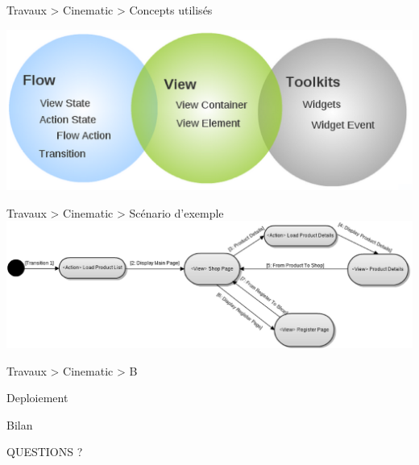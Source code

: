 \documentclass[HeilHazel,pdf,final,colorBG,slideColor]{prosper}
\begin{document}
\begin{slide}{Travaux > Cinematic > Concepts utilisés}

  \bc{} 
    \includegraphics[scale=.3]{img/cinematic_concepts.eps} 
  \ec{}

\end{slide}

\begin{slide}{Travaux > Cinematic > Scénario d'exemple}
  \bc{} 
    \includegraphics[scale=.25]{img/cinematic_act.eps} 
  \ec{}
\end{slide}

\begin{slide}{Travaux > Cinematic > B}

\end{slide}

\begin{slide}{Deploiement}

\end{slide}


\begin{slide}{Bilan}

\end{slide}


\begin{slide}{QUESTIONS ?}

\end{slide}
\end{document}
